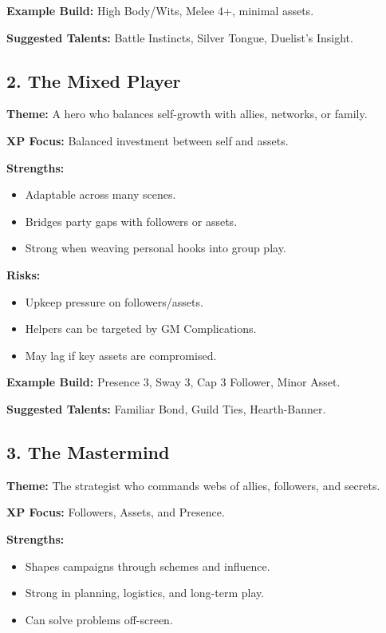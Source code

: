 \textbf{Example Build:} High Body/Wits, Melee 4+, minimal assets.

\textbf{Suggested Talents:} Battle Instincts, Silver Tongue, Duelist's Insight.

\subsection*{2. The Mixed Player}

\textbf{Theme:} A hero who balances self-growth with allies, networks, or family.

\textbf{XP Focus:} Balanced investment between self and assets.

\textbf{Strengths:}
\begin{itemize}
  \item Adaptable across many scenes.
  \item Bridges party gaps with followers or assets.
  \item Strong when weaving personal hooks into group play.
\end{itemize}

\textbf{Risks:}
\begin{itemize}
  \item Upkeep pressure on followers/assets.
  \item Helpers can be targeted by GM Complications.
  \item May lag if key assets are compromised.
\end{itemize}

\textbf{Example Build:} Presence 3, Sway 3, Cap 3 Follower, Minor Asset.

\textbf{Suggested Talents:} Familiar Bond, Guild Ties, Hearth-Banner.

\subsection*{3. The Mastermind}

\textbf{Theme:} The strategist who commands webs of allies, followers, and secrets.

\textbf{XP Focus:} Followers, Assets, and Presence.

\textbf{Strengths:}
\begin{itemize}
  \item Shapes campaigns through schemes and influence.
  \item Strong in planning, logistics, and long-term play.
  \item Can solve problems off-screen.
\end{itemize}

